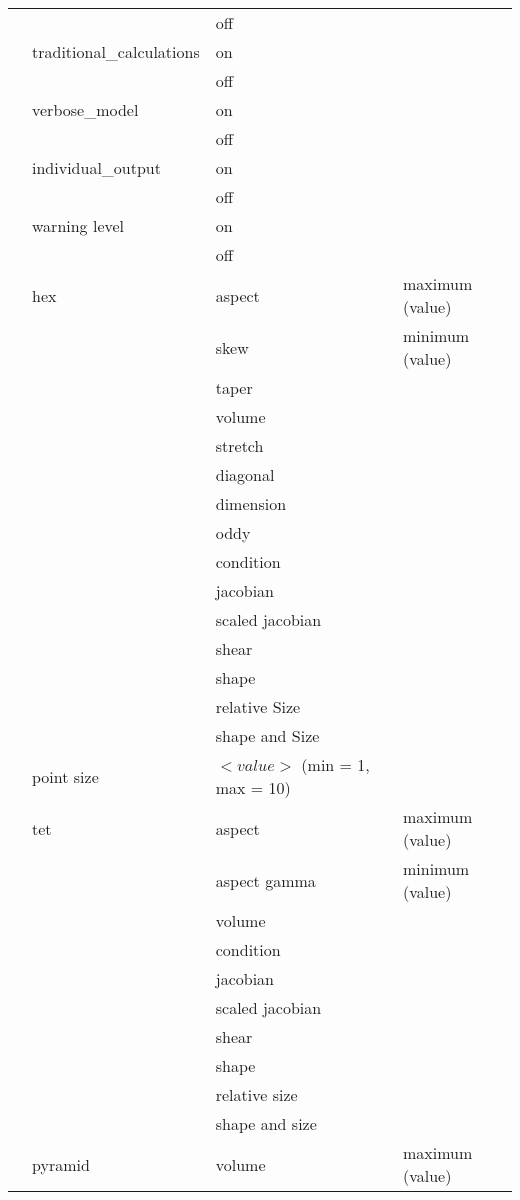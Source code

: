 \documentclass[10pt]{report}
\begin{document}
\begin{appendix}
\begin{center}
\begin{longtable}{|l|l|l|l|}
 &                          & off & \\
\cline{2-4}
 & traditional\_calculations  & on & \\
 &                           & off & \\
\cline{2-4}
 & verbose\_model            & on & \\
 &                          & off & \\
\cline{2-4}
 & individual\_output            & on & \\
 &                          & off & \\
\cline{2-4}
 & warning level            & on & \\
 &                          & off & \\
\cline{2-4}
 & hex & aspect & maximum (value) \\
 &     & skew & minimum (value) \\
 &     & taper  & \\
 &     & volume  & \\
 &     & stretch  & \\
 &     & diagonal  & \\
 &     & dimension  & \\
 &     & oddy &  \\
 &     & condition  & \\
 &     & jacobian  & \\
 &     & scaled jacobian & \\
 &     & shear &  \\
 &     & shape &  \\
 &     & relative Size & \\
 &     & shape and Size  & \\
\cline{2-4}
&point size & $<value>$ (min = 1, max = 10) & \\
\cline{2-4}
 &tet & aspect & maximum (value) \\
 &    & aspect gamma & minimum (value) \\
 &    & volume  & \\ 
 &    & condition  & \\ 
 &    & jacobian  & \\ 
 &    & scaled jacobian  & \\
 &    & shear   & \\
 &    & shape   & \\
 &    & relative size   & \\
 &    & shape and size  & \\
\cline{2-4}
 &pyramid &  volume & maximum (value) \\

\end{longtable}
\end{center}
\end{appendix}
\end{document}
